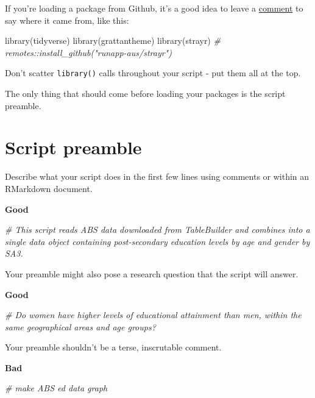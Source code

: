\documentclass[
]{book}
\newenvironment{Shaded}{\begin{snugshade}}{\end{snugshade}}
\newcommand{\CommentTok}[1]{\textcolor[rgb]{0.56,0.35,0.01}{\textit{#1}}}
\newcommand{\FunctionTok}[1]{\textcolor[rgb]{0.00,0.00,0.00}{#1}}
\newcommand{\NormalTok}[1]{#1}
\begin{document}
If you're loading a package from Github, it's a good idea to leave a \protect\hyperlink{use-comments}{comment} to say where it came from, like this:

\begin{Shaded}
\begin{Highlighting}[]
\FunctionTok{library}\NormalTok{(tidyverse)}
\FunctionTok{library}\NormalTok{(grattantheme)}
\FunctionTok{library}\NormalTok{(strayr) }\CommentTok{\# remotes::install\_github("runapp{-}aus/strayr")}
\end{Highlighting}
\end{Shaded}

Don't scatter \texttt{library()} calls throughout your script - put them all at the top.

The only thing that should come before loading your packages is the script preamble.

\hypertarget{script-preamble}{%
\section{Script preamble}\label{script-preamble}}

Describe what your script does in the first few lines using comments or within an RMarkdown document.

\textbf{Good}

\begin{Shaded}
\begin{Highlighting}[]
\CommentTok{\# This script reads ABS data downloaded from TableBuilder and combines into a single data object containing post{-}secondary education levels by age and gender by SA3. }
\end{Highlighting}
\end{Shaded}

Your preamble might also pose a research question that the script will answer.

\textbf{Good}

\begin{Shaded}
\begin{Highlighting}[]
\CommentTok{\# Do women have higher levels of educational attainment than men, within the same geographical areas and age groups?}
\end{Highlighting}
\end{Shaded}

Your preamble shouldn't be a terse, inscrutable comment.

\textbf{Bad}

\begin{Shaded}
\begin{Highlighting}[]
\CommentTok{\# make ABS ed data graph}
\end{Highlighting}
\end{Shaded}
\end{document}
